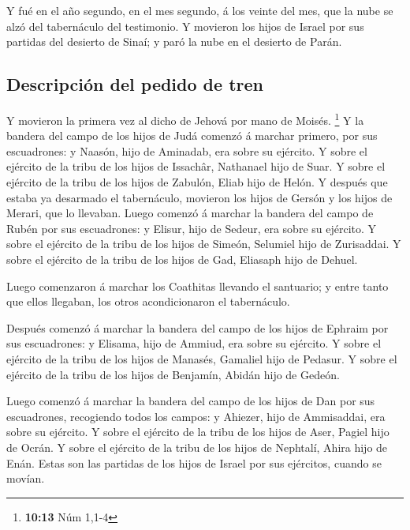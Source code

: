  Y fué en el año segundo, en el mes segundo, á los veinte
del mes, que la nube se alzó del tabernáculo del testimonio.
 Y movieron los hijos de Israel por sus partidas del
desierto de Sinaí; y paró la nube en el desierto de Parán.

\hypertarget{descripciuxf3n-del-pedido-de-tren}{%
\subsection{Descripción del pedido de
tren}\label{descripciuxf3n-del-pedido-de-tren}}

 Y movieron la primera vez al dicho de Jehová por mano de
Moisés. \footnote{\textbf{10:13} Núm 1,1-4}  Y la bandera
del campo de los hijos de Judá comenzó á marchar primero, por sus
escuadrones: y Naasón, hijo de Aminadab, era sobre su ejército.
 Y sobre el ejército de la tribu de los hijos de
Issachâr, Nathanael hijo de Suar.  Y sobre el ejército de
la tribu de los hijos de Zabulón, Eliab hijo de Helón.  Y
después que estaba ya desarmado el tabernáculo, movieron los hijos de
Gersón y los hijos de Merari, que lo llevaban.  Luego
comenzó á marchar la bandera del campo de Rubén por sus escuadrones: y
Elisur, hijo de Sedeur, era sobre su ejército.  Y sobre
el ejército de la tribu de los hijos de Simeón, Selumiel hijo de
Zurisaddai.  Y sobre el ejército de la tribu de los hijos
de Gad, Eliasaph hijo de Dehuel.

 Luego comenzaron á marchar los Coathitas llevando el
santuario; y entre tanto que ellos llegaban, los otros acondicionaron el
tabernáculo.

 Después comenzó á marchar la bandera del campo de los
hijos de Ephraim por sus escuadrones: y Elisama, hijo de Ammiud, era
sobre su ejército.  Y sobre el ejército de la tribu de
los hijos de Manasés, Gamaliel hijo de Pedasur.  Y sobre
el ejército de la tribu de los hijos de Benjamín, Abidán hijo de Gedeón.

 Luego comenzó á marchar la bandera del campo de los
hijos de Dan por sus escuadrones, recogiendo todos los campos: y
Ahiezer, hijo de Ammisaddai, era sobre su ejército.  Y
sobre el ejército de la tribu de los hijos de Aser, Pagiel hijo de
Ocrán.  Y sobre el ejército de la tribu de los hijos de
Nephtalí, Ahira hijo de Enán.  Estas son las partidas de
los hijos de Israel por sus ejércitos, cuando se movían.

